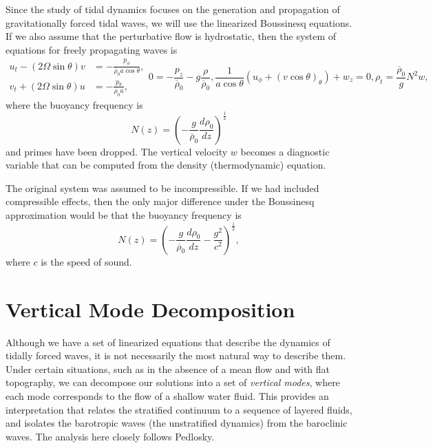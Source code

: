 \documentclass[11pt]{article}
\begin{document}
Since the study of tidal dynamics focuses on the generation and propagation of gravitationally forced tidal waves, we will use the linearized Boussinesq equations. If we also assume that the perturbative flow is hydrostatic, then the system of equations for freely propagating waves is
\begin{subequations}
\label{LinearBoussinesq}
\begin{align}
u_t - \left(2\Omega \sin\theta \right) v &= - \frac{p_\phi}{\overline{\rho}_0 a \cos\theta}, \\
v_t + \left(2\Omega \sin\theta \right) u &= - \frac{p_{\theta}}{\overline{\rho}_0 a},
\end{align}
\begin{equation}
0 = - \frac{p_z}{\overline{\rho}_0} - g \frac{\rho}{\overline{\rho}_0} ,
\end{equation}
\begin{equation}
\frac{1}{a \cos\theta}\left(u_{\phi} + \left(v \cos\theta \right)_{\theta} \right) + w_z =0,
\end{equation}
\begin{equation}
\rho_t = \frac{\overline{\rho}_0}{g} N^2 w,
\end{equation}
\end{subequations}
where the buoyancy frequency is
\begin{equation*}
N(z) = \left(-\frac{g}{\overline{\rho}_0} \frac{d\rho_0}{dz}\right)^{\frac{1}{2}}
\end{equation*}
and primes have been dropped. The vertical velocity $w$ becomes a diagnostic variable that can be computed from the density (thermodynamic) equation. 

The original system was assumed to be incompressible. If we had included compressible effects, then the only major difference under the Boussinesq approximation would be that the buoyancy frequency is
\begin{equation*}
N(z) = \left(-\frac{g}{\overline{\rho}_0} \frac{d\rho_0}{dz} - \frac{g^2}{c^2}\right)^{\frac{1}{2}},
\end{equation*}
where $c$ is the speed of sound.


\section{Vertical Mode Decomposition}

Although we have a set of linearized equations that describe the dynamics of tidally forced waves, it is not necessarily the most natural way to describe them. Under certain situations, such as in the absence of a mean flow and with flat topography, we can decompose our solutions into a set of \emph{vertical modes}, where each mode corresponds to the flow of a shallow water fluid. This provides an interpretation that relates the stratified continuum to a sequence of layered fluids, and isolates the barotropic waves (the unstratified dynamics) from the baroclinic waves. The analysis here closely follows Pedlosky.\cite{PedloskyWaves}
\end{document}
